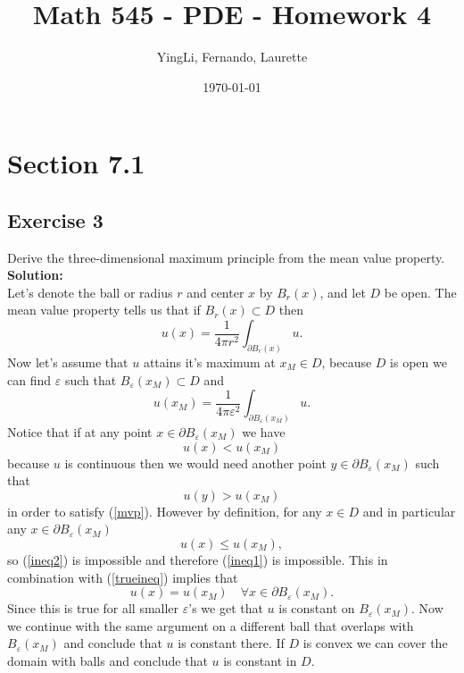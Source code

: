 \documentclass[12pt]{article}%
\begin{document}
\title{Math 545 - PDE - Homework 4}
\author{YingLi, Fernando, Laurette }
\date{\today}
\maketitle

\section*{Section 7.1}
\subsection*{Exercise 3}
Derive the three-dimensional maximum principle from the mean value property.\\
\textbf{Solution:}\\
Let's denote the ball or radius $r$ and center $x$ by $B_r(x)$, and let $D$ be
open. The mean value property tells us that if $B_r(x)\subset D$ then
\[
    u(x)=\frac{1}{4\pi r^2}\int_{\partial B_r(x)}u.
\]
Now let's assume that $u$ attains it's maximum at $x_M\in D$, because $D$ is
open we can find $\varepsilon$ such that $B_\varepsilon(x_M) \subset D$ and
\begin{equation}\label{mvp}
    u(x_M) = \frac{1}{4\pi \varepsilon^2}\int_{\partial B_\varepsilon(x_M)} u.
\end{equation}
Notice that if at any point $x\in \partial B_\varepsilon(x_M)$ we have
\begin{equation}\label{ineq1}
u(x) < u(x_M)
\end{equation}
because $u$ is continuous then we would need another point
$y\in \partial B_\varepsilon(x_M)$ such that
\begin{equation}\label{ineq2}
u(y)>u(x_M)
\end{equation}
in order to satisfy
(\ref{mvp}). However by definition, for
any $x\in D$ and in particular any $x\in \partial
B_\varepsilon(x_M)$
\begin{equation}\label{trueineq}
    u(x)\leq u(x_M),
\end{equation}
so (\ref{ineq2}) is impossible and therefore (\ref{ineq1}) is impossible. This
in combination with (\ref{trueineq}) implies that
\[
u(x)=u(x_M) \quad \forall x \in \partial B_\varepsilon(x_M).
\]
Since this is true for all smaller $\varepsilon$'s we get that $u$ is constant
on $B_\varepsilon(x_M)$. Now we continue with the same argument on a different
ball that overlaps with $B_\varepsilon(x_M)$ and conclude that $u$ is constant
there. If $D$ is convex we can cover the domain with balls and conclude that
$u$ is constant in $D$. \qedsymbol
\end{document}
